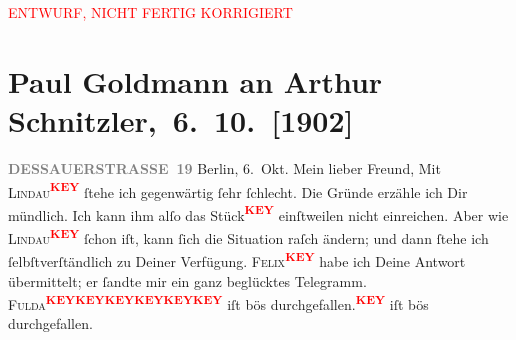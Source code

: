 
\begin{center}
            \textcolor{red}{ENTWURF, NICHT FERTIG KORRIGIERT}
                      \end{center}
            
         
         \renewcommand{\erwaehntePersonen}{Personen: Olga Schnitzler}
         \renewcommand{\erwaehnteOrte}{Orte: Berlin, Dessauer Straße, Wien}
         \renewcommand{\erwaehnteWerke}{}
               \section[ Paul Goldmann an Arthur Schnitzler, 6. 10. {[}1902{]}]{ Paul Goldmann an Arthur Schnitzler, 6. 10. {[}1902{]}}\nopagebreak{}\rehead{ }\begin{ledgroupsized}[t]{13cm}\normalsize\beginnumbering \toendnotes[C]{\smallbreak\pagebreak[2]} 
\pstart
           \noindent{}\raggedleft{}{\pb}\textcolor{gray}{\textbf{DESSAUERSTRASSE 19}}\pend
           \pstart
           Berlin, 6. Okt.\pend
           \pstart\center{}Mein lieber Freund,\pend\pstart
           Mit \textsc{Lindau\textcolor{red}{\textsuperscript{\textbf{KEY}}}} ſtehe ich gegenwärtig ſehr ſchlecht. Die Gründe erzähle ich Dir mündlich.
                    Ich kann ihm alſo das Stück\textcolor{red}{\textsuperscript{\textbf{KEY}}} einſtweilen nicht
                    einreichen. Aber wie \textsc{Lindau\textcolor{red}{\textsuperscript{\textbf{KEY}}}} ſchon iſt, kann ſich die Situation raſch ändern; und dann ſtehe ich
                    ſelbſtverſtändlich zu Deiner Verfügung. \pend
           \pstart
           \textsc{Felix\textcolor{red}{\textsuperscript{\textbf{KEY}}}} habe ich Deine Antwort {\pb} übermittelt; er
                    ſandte mir ein ganz beglücktes Telegramm. \pend
           \pstart
           \textsc{Fulda\textcolor{red}{\textsuperscript{\textbf{KEY}}}\textcolor{red}{\textsuperscript{\textbf{KEY}}}\textcolor{red}{\textsuperscript{\textbf{KEY}}}\textcolor{red}{\textsuperscript{\textbf{KEY}}}\textcolor{red}{\textsuperscript{\textbf{KEY}}}\textcolor{red}{\textsuperscript{\textbf{KEY}}}} iſt bös durchgefallen.\textcolor{red}{\textsuperscript{\textbf{KEY}}} iſt bös durchgefallen. \pend

\end{ledgroupsized}
